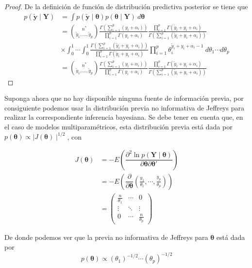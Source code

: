 \documentclass[
  10pt,
  spanish,
]{book}
\theoremstyle{definition}
\theoremstyle{definition}
\theoremstyle{definition}
\theoremstyle{definition}
\theoremstyle{remark}
\begin{document}
\begin{proof}
{}De la definición de función de distribución predictiva posterior se tiene que
\begin{align*}
p(\tilde{\mathbf{y}} \mid \mathbf{Y})&=\int p(\tilde{\mathbf{y}} \mid \boldsymbol \theta)p(\boldsymbol \theta\mid \mathbf{Y})\ d\boldsymbol \theta\\
&=\binom{n^*}{\tilde{y}_1,\ldots,\tilde{y}_p} \frac{\Gamma(\sum_{i=1}^p(y_i+\alpha_i))}{\prod_{i=1}^p\Gamma(y_i+\alpha_i)}
\frac{\prod_{i=1}^p\Gamma(\tilde{y}_i+y_i+\alpha_i)}{\Gamma(\sum_{i=1}^p(\tilde{y}_i+y_i+\alpha_i))}\\
&\times
\int_0^1 \cdots \int_0^1 \frac{\Gamma(\sum_{i=1}^p(\tilde{y}_i+y_i+\alpha_i))}{\prod_{i=1}^p\Gamma(\tilde{y}_i+y_i+\alpha_i)}
\prod_{i=1}^p\theta_i^{\tilde{y}_i+y_i+\alpha_i-1} \ d\theta_1 \cdots d\theta_p\\
&=\binom{n^*}{\tilde{y}_1,\ldots,\tilde{y}_p} \frac{\Gamma(\sum_{i=1}^p(y_i+\alpha_i))}{\prod_{i=1}^p\Gamma(y_i+\alpha_i)}
\frac{\prod_{i=1}^p\Gamma(\tilde{y}_i+y_i+\alpha_i)}{\Gamma(\sum_{i=1}^p(\tilde{y}_i+y_i+\alpha_i))}
\end{align*}
\end{proof}

Suponga ahora que no hay disponible ninguna fuente de información previa, por consiguiente podemos usar la distribución previa no informativa de Jeffreys para realizar la correspondiente inferencia bayesiana. Se debe tener en cuenta que, en el caso de modelos multiparamétricos, esta distribución previa está dada por \(p(\boldsymbol \theta)\propto \mid J(\boldsymbol \theta)\mid^{1/2}\), con

\begin{align*}
J(\boldsymbol \theta)&=-E\left(\dfrac{\partial^2 \ln p(\mathbf{Y}\mid\boldsymbol \theta)}{\partial\boldsymbol \theta\partial\boldsymbol \theta'}\right)\\
&=-E\left(\dfrac{\partial}{\partial\boldsymbol \theta}\left(\frac{y_1}{\theta_1},\cdots,\frac{y_p}{\theta_p}\right)\right)\\
&=\begin{pmatrix}\frac{n}{\theta_1}&\cdots&0\\
\vdots&\ddots&\vdots\\0&\cdots&\frac{n}{\theta_p}\end{pmatrix}
\end{align*}

De donde podemos ver que la previa no informativa de Jeffreys para \(\boldsymbol \theta\) está dada por
\begin{equation*}
p(\boldsymbol \theta)\propto(\theta_1)^{-1/2}\cdots(\theta_p)^{-1/2}
\end{equation*}
\end{document}
